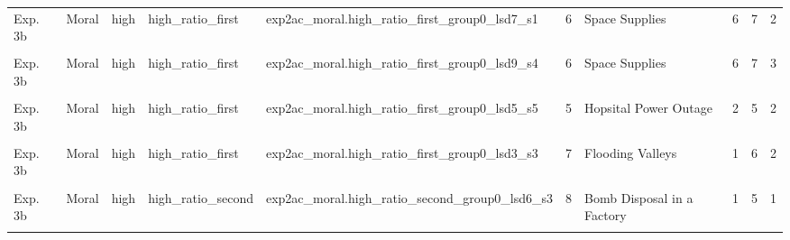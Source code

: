 \documentclass[
]{article}
\begin{document}
\begin{longtable}[t]{lllllrlrrr}
Exp. 3b & Moral & high & high\_ratio\_first & exp2ac\_moral.high\_ratio\_first\_group0\_lsd7\_s1 & 6 & Space Supplies & 6 & 7 & 2\\
\addlinespace
\cellcolor{gray!10}{Exp. 3b} & \cellcolor{gray!10}{Moral} & \cellcolor{gray!10}{high} & \cellcolor{gray!10}{high\_ratio\_first} & \cellcolor{gray!10}{exp2ac\_moral.high\_ratio\_first\_group0\_lsd7\_s4} & \cellcolor{gray!10}{6} & \cellcolor{gray!10}{Space Supplies} & \cellcolor{gray!10}{6} & \cellcolor{gray!10}{7} & \cellcolor{gray!10}{1}\\
Exp. 3b & Moral & high & high\_ratio\_first & exp2ac\_moral.high\_ratio\_first\_group0\_lsd9\_s4 & 6 & Space Supplies & 6 & 7 & 3\\
\cellcolor{gray!10}{Exp. 3b} & \cellcolor{gray!10}{Moral} & \cellcolor{gray!10}{high} & \cellcolor{gray!10}{high\_ratio\_first} & \cellcolor{gray!10}{exp2ac\_moral.high\_ratio\_first\_group0\_lsd5\_s3} & \cellcolor{gray!10}{5} & \cellcolor{gray!10}{Hopsital Power Outage} & \cellcolor{gray!10}{2} & \cellcolor{gray!10}{8} & \cellcolor{gray!10}{1}\\
Exp. 3b & Moral & high & high\_ratio\_first & exp2ac\_moral.high\_ratio\_first\_group0\_lsd5\_s5 & 5 & Hopsital Power Outage & 2 & 5 & 2\\
\cellcolor{gray!10}{Exp. 3b} & \cellcolor{gray!10}{Moral} & \cellcolor{gray!10}{high} & \cellcolor{gray!10}{high\_ratio\_first} & \cellcolor{gray!10}{exp2ac\_moral.high\_ratio\_first\_group0\_lsd1\_s4} & \cellcolor{gray!10}{2} & \cellcolor{gray!10}{Bomb on the Train} & \cellcolor{gray!10}{1} & \cellcolor{gray!10}{10} & \cellcolor{gray!10}{1}\\
\addlinespace
Exp. 3b & Moral & high & high\_ratio\_first & exp2ac\_moral.high\_ratio\_first\_group0\_lsd3\_s3 & 7 & Flooding Valleys & 1 & 6 & 2\\
\cellcolor{gray!10}{Exp. 3b} & \cellcolor{gray!10}{Moral} & \cellcolor{gray!10}{high} & \cellcolor{gray!10}{high\_ratio\_first} & \cellcolor{gray!10}{exp2ac\_moral.high\_ratio\_first\_group0\_lsd9\_s2} & \cellcolor{gray!10}{3} & \cellcolor{gray!10}{Fuming Hospital} & \cellcolor{gray!10}{1} & \cellcolor{gray!10}{10} & \cellcolor{gray!10}{1}\\
Exp. 3b & Moral & high & high\_ratio\_second & exp2ac\_moral.high\_ratio\_second\_group0\_lsd6\_s3 & 8 & Bomb Disposal in a Factory & 1 & 5 & 1\\
\cellcolor{gray!10}{Exp. 3b} & \cellcolor{gray!10}{Moral} & \cellcolor{gray!10}{high} & \cellcolor{gray!10}{high\_ratio\_second} & \cellcolor{gray!10}{exp2ac\_moral.high\_ratio\_second\_group0\_lsd12\_s1} & \cellcolor{gray!10}{7} & \cellcolor{gray!10}{Flooding Valleys} & \cellcolor{gray!10}{1} & \cellcolor{gray!10}{1} & \cellcolor{gray!10}{1}\\

\end{longtable}
\end{document}
